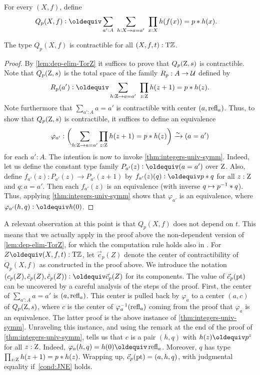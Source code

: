 \documentclass[a4paper,12pt]{amsart}
\begin{document}
\begin{definition}\label{def:guided-null-hmtps}
For every $(X,f)$, define
\begin{align*}\label{eq:TBD}
Q_p(X,f)&\defeq \sum_{a':A}~\sum_{h:X\to a=a'}~\prod_{x:X} h(f(x))=p\ct h(x).
\end{align*}
\end{definition}

\begin{lemma}\label{lem:guided-null-hmtps}
The type $Q_p(X,f)$ is contractible for all $(X,f,t):{\mathrm{T}\mathbb{Z}}$.
\end{lemma}
\begin{proof}
  By \cref{lem:dep-elim-TorZ} it suffices to prove that $Q_p(\mathrm{Z},s)$ is contractible.
  Note that $Q_p(\mathrm{Z},s)$ is the total space of the family $R_p : A \to \mathcal{U}$ defined by
  \[
    R_p(a') \defeq \sum_{h:\zet \to a=a'}~\prod_{z:\zet} h(z+1)=p\ct h(z).
  \]
  Note furthermore that $\sum_{a':A} a=a'$ is contractible with center $(a,\mathop{{\mathrm{refl}}_{a}})$.
  Thus, to show that $Q_p(\mathrm{Z},s)$ is contractible,
  it suffices to define an equivalence
  \[
    \varphi_{a'} : \biggl(\sum_{h:\mathrm{Z} \to a=a'}\prod_{z:\mathrm{Z}} h(z+1)=p* h(z)\biggr) \xrightarrow{\sim}{} (a=a')
  \]
  for each $a':A$.
  The intention is now to invoke \cref{thm:integers-univ-symm}.
  Indeed, let us define the constant type family $P_{a'}(z)\defeq(a=a')$
  over $\mathrm{Z}$. Also, define $f_{a'}(z) : P_{a'}(z) \to P_{a'}(z+1)$
  by $f_{a'}(z)(q) \defeq p \ct q$ for all $z:\mathrm{Z}$ and $q: a=a'$.
  Then each $f_{a'}(z)$ is an equivalence (with inverse $q \mapsto p^{-1}* q$).
  Thus, applying \cref{thm:integers-univ-symm}
  shows that $\varphi_{a'}$ is an equivalence,
  where $\varphi_{a'}(h,q) \defeq h(0)$.
\end{proof}

A relevant observation at this point is that $Q_p(X,f)$ does not depend on $t$.
This means that we actually apply in the proof above the non-dependent version
of \cref{lem:dep-elim-TorZ}, for which the computation rule holds also in \UniMath{}.
For $Z \jdeq (X,f,t) : \TorZ$, let $\vec{c}_p(Z)$ denote the center of contractibility
of $Q_p(X,f)$ as constructed in the proof above.
  We introduce the notation $(c_p(Z),\tilde{c}_p(Z),\hat{c}_p(Z))\defeq\vec{c}_p(Z)$ for its components.
  The value of $\vec{c}_p({\mathord{\mathrm{pt}}})$ can be uncovered by a careful analysis of the steps of the proof.
First, the center of $\sum_{a':A} a=a'$ is $(a,\mathop{{\mathrm{refl}}_{a}})$.
This center is pulled back by $\varphi_{a}$ to a center
$(a,c)$ of $Q_p(\mathrm{Z},s)$, where $c$ is the center of
$\varphi_{a}^{-1}(\mathop{{\mathrm{refl}}_{a}})$ coming from the proof
that $\varphi_{a}$ is an equivalence. The latter proof
is the above instance of \cref{thm:integers-univ-symm}.
Unraveling this instance, and using the remark at the
end of the proof of \cref{thm:integers-univ-symm},
tells us that $c$ is a pair $(h,q)$ with $h(z)\jdeq p^z$
for all $z:\mathrm{Z}$. Indeed, $\varphi_{a}(h,q) = h(0) \jdeq \refl{a}$.
Moreover, $q$ has type $\prod_{z:\mathrm{Z}} h(z+1)=p* h(z)$.
Wrapping up, $\vec c_p({\mathord{\mathrm{pt}}}) = (a,h,q)$,
with judgmental equality if~\cref{cond:JNE} holds.
\end{document}
